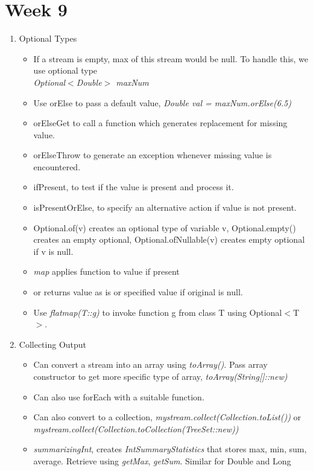 \documentclass[a4paper]{article}
\begin{document}
\section{Week 9}
\begin{enumerate}
    \item Optional Types
    \begin{itemize}
        \item If a stream is empty, max of this stream would be null. To handle this, we use optional type\\
        \textit{Optional$<$Double$>$ maxNum}
        \item Use orElse to pass a default value, \textit{Double val = maxNum.orElse(6.5)}
        \item orElseGet to call a function which generates replacement for missing value.
        \item orElseThrow to generate an exception whenever missing value is encountered.
        \item ifPresent, to test if the value is present and process it.
        \item isPresentOrElse, to specify an alternative action if value is not present.
        \item Optional.of(v) creates an optional type of variable v, Optional.empty() creates an empty optional, Optional.ofNullable(v) creates empty optional if v is null.
        \item \textit{map} applies function to value if present
        \item or returns value as is or specified value if original is null.
        \item Use \textit{flatmap(T::g)} to invoke function g from class T using Optional$<$T$>$.
    \end{itemize}
    \item Collecting Output
    \begin{itemize}
        \item Can convert a stream into an array using \textit{toArray()}. Pass array constructor to get more specific type of array, \textit{toArray(String[]::new)}
        \item Can also use forEach with a suitable function.
        \item Can also convert to a collection, \textit{mystream.collect(Collection.toList())} or\\
        \textit{mystream.collect(Collection.toCollection(TreeSet::new))}
        \item \textit{summarizingInt}, creates \textit{IntSummaryStatistics} that stores max, min, sum, average. Retrieve using \textit{getMax}, \textit{getSum}. Similar for Double and Long

\end{itemize}
\end{enumerate}
\end{document}
